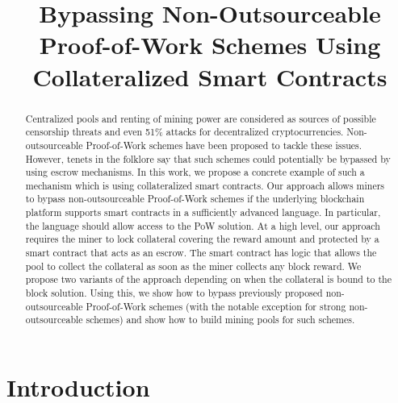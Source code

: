 \documentclass[runningheads]{llncs}
\begin{document}
\title{Bypassing Non-Outsourceable Proof-of-Work Schemes Using Collateralized Smart Contracts}
\maketitle

\begin{abstract}
    Centralized pools and renting of mining power are considered as sources of possible censorship threats and even 51\%
    attacks for decentralized cryptocurrencies. Non-outsourceable Proof-of-Work schemes have been proposed to tackle these issues. However, tenets in the folklore say that such schemes could potentially be bypassed by using escrow mechanisms.
    In this work, we propose a concrete example of such a mechanism which is using collateralized smart contracts. Our approach allows miners to bypass non-outsourceable Proof-of-Work schemes
    if the underlying blockchain platform supports smart contracts in a sufficiently advanced language. In particular, the language
    should allow access to the PoW solution.
    At a high level, our approach requires the miner to lock collateral covering the reward amount and protected by a smart contract that acts as an escrow. The smart contract has logic that allows the pool to collect the collateral as soon as the miner collects any block reward. We propose two variants of the approach depending on when the collateral is bound to the block solution. Using this, we show how to bypass previously proposed non-outsourceable Proof-of-Work schemes (with the notable exception for strong non-outsourceable schemes) and show how to build mining pools for such schemes.
\end{abstract}

\section{Introduction}
\end{document}
